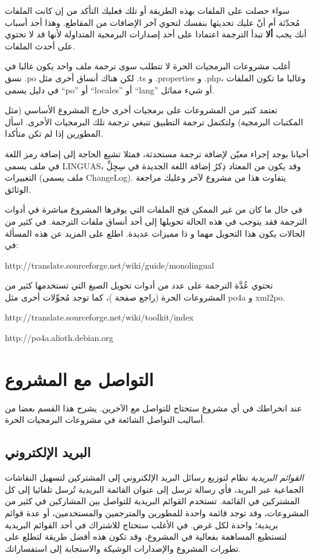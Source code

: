 سواء حصلت على الملفات بهذه الطريقة أو تلك فعليك التأكد من إن كانت
الملفات مُحدّثة أم أنّ عليك تحديثها بنفسك لتحوي آخر الإضافات من
المقاطع. وهذا أحد أسباب أنك يجب {\bf ألا} تبدأ الترجمة اعتمادا على أحد
إصدارات البرمجية المتداولة لأنها قد لا تحتوي على أحدث الملفات.

أغلب مشروعات البرمجيات الحرة لا تتطلب سوى ترجمة ملف واحد يكون غالبا في
نسق ‪.po‬ لكن هناك أنساق أخرى مثل ‪.ts‬ و ‪.properties‬ و ‪.php‬،
وغالبا ما تكون الملفات في دليل يسمى “po” أو “locales” أو “lang” أو شيء
مماثل.

تعتمد كثير من المشروعات على برمجيات أخرى خارج المشروع الأساسي (مثل
المكتبات البرمجية) ولتكتمل ترجمة التطبيق تنبغي ترجمة تلك البرمجيات
الأخرى. اسأل المطورين إذا لم تكن متأكدا.

أحيانا يوجد إجراء معيّن لإضافة ترجمة مستحدثة، فمثلا تشيع الحاجة إلى
إضافة رمز اللغة في ملف يسمى LINGUAS، وقد يكون من المعتاد ذِكرُ إضافة
اللغة الجديدة في سِجِلِّ التغييرات (ملف يسمى ChangeLog). يتفاوت هذا من
مشروع لآخر وعليك مراجعة الوثائق.

في حال ما كان من غير الممكن فتح الملفات التي يوفرها المشروع مباشرة في
أدوات الترجمة فقد يتوجب في هذه الحالة تحويلها إلى أحد أنساق ملفات
الترجمة. في كثير من الحالات يكون هذا التحويل مهما و ذا مميزات عديدة.
اطلع على المزيد عن هذه المسألة في:

http://translate.sourceforge.net/wiki/guide/monolingual

تحتوي عُدَّة الترجمة على عدد من أدوات تحويل الصيغ التي تستخدمها كثير من
المشروعات الحرة (راجع صفحة \at[ref:20165030])، كما توجد
مُحوِّلات أخرى مثل po4a و xml2po.

http://translate.sourceforge.net/wiki/toolkit/index

http://po4a.alioth.debian.org

\section{التواصل مع المشروع}
عند انخراطك في أي مشروع ستحتاج للتواصل مع الآخرين. يشرح هذا القسم بعضا
من أساليب التواصل الشائعة في مشروعات البرمجيات الحرة.

\subsection{البريد الإلكتروني}
{\it القوائم البريدية} نظام لتوزيع رسائل البريد الإلكتروني إلى المشتركين
لتسهيل النقاشات الجماعية عبر البريد، فأي رسالة ترسل إلى عنوان القائمة
البريدية تُرسل تلقائيا إلى كل المشتركين في القائمة. تستخدم القوائم
البريدية للتواصل بين المشاركين في كثير من المشروعات، وقد توجد قائمة
واحدة للمطورين والمترجمين والمستخدمين، أو عدة قوائم بريدية؛ واحدة لكل
غرض. في الأغلب ستحتاج للاشتراك في أحد القوائم البريدية لتستطيع المساهمة
بفعالية في المشروع، وقد تكون هذه أفضل طريقة لتطلع على تطورات المشروع
والإصدارات الوشيكة والاستجابة إلى استفساراتك.

